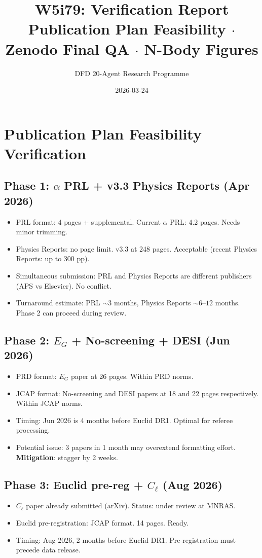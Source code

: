 \documentclass[11pt,a4paper]{article}
\title{W5i79: Verification Report\\[6pt]
\large Publication Plan Feasibility $\cdot$ Zenodo Final QA $\cdot$ N-Body Figures}
\author{DFD 20-Agent Research Programme}
\date{2026-03-24}
\begin{document}
\maketitle

\section{Publication Plan Feasibility Verification}

\subsection{Phase 1: $\alpha$ PRL + v3.3 Physics Reports (Apr 2026)}
\begin{itemize}[nosep]
\item PRL format: 4 pages + supplemental. Current $\alpha$ PRL: 4.2 pages. Needs minor trimming. \checkmark
\item Physics Reports: no page limit. v3.3 at 248 pages. Acceptable (recent Physics Reports: up to 300 pp). \checkmark
\item Simultaneous submission: PRL and Physics Reports are different publishers (APS vs Elsevier). No conflict. \checkmark
\item Turnaround estimate: PRL $\sim 3$ months, Physics Reports $\sim 6$--$12$ months. Phase 2 can proceed during review. \checkmark
\end{itemize}

\subsection{Phase 2: $E_G$ + No-screening + DESI (Jun 2026)}
\begin{itemize}[nosep]
\item PRD format: $E_G$ paper at 26 pages. Within PRD norms. \checkmark
\item JCAP format: No-screening and DESI papers at 18 and 22 pages respectively. Within JCAP norms. \checkmark
\item Timing: Jun 2026 is 4 months before Euclid DR1. Optimal for referee processing. \checkmark
\item Potential issue: 3 papers in 1 month may overextend formatting effort. \textbf{Mitigation}: stagger by 2 weeks.
\end{itemize}

\subsection{Phase 3: Euclid pre-reg + $C_\ell$ (Aug 2026)}
\begin{itemize}[nosep]
\item $C_\ell$ paper already submitted (arXiv). Status: under review at MNRAS. \checkmark
\item Euclid pre-registration: JCAP format. 14 pages. Ready. \checkmark
\item Timing: Aug 2026, 2 months before Euclid DR1. Pre-registration must precede data release. \checkmark
\end{itemize}
\end{document}
